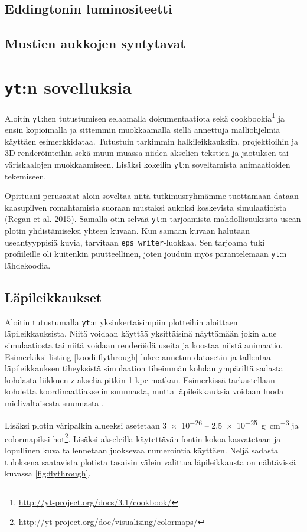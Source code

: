 \documentclass[12pt,a4paper]{article}
\newcommand{\yt}{\texttt{yt}}
\begin{document}
\subsection{Eddingtonin luminositeetti}

\subsection{Mustien aukkojen syntytavat}

\section{\yt :n sovelluksia} %
Aloitin \yt :hen tutustumisen selaamalla dokumentaatiota sekä cookbookia\footnote{\url{http://yt-project.org/docs/3.1/cookbook/}} ja ensin kopioimalla ja sittemmin muokkaamalla siellä annettuja malliohjelmia käyttäen esimerkkidataa. Tutustuin tarkimmin halkileikkauksiin, projektioihin ja 3D-renderöinteihin sekä muun muassa niiden akselien tekstien ja jaotuksen tai väriskaalojen muokkaamiseen. Lisäksi kokeilin \yt :n soveltamista animaatioiden tekemiseen.

Opittuani perusasiat aloin soveltaa niitä tutkimusryhmämme tuottamaan dataan kaasupilven romahtamista suoraan mustaksi aukoksi koskevista simulaatioista (Regan et al. 2015). Samalla otin selvää \yt :n tarjoamista mahdollisuuksista usean plotin yhdistämiseksi yhteen kuvaan. Kun samaan kuvaan halutaan useantyyppisiä kuvia, tarvitaan \texttt{eps\_writer}-luokkaa. Sen tarjoama tuki profiileille oli kuitenkin puutteellinen, joten jouduin myös parantelemaan \yt :n lähdekoodia.

\subsection{Läpileikkaukset}
Aloitin tutustumalla \yt :n yksinkertaisimpiin plotteihin aloittaen läpileikkauksista. Niitä voidaan käyttää yksittäisinä näyttämään jokin alue simulaatiosta tai niitä voidaan renderöidä useita ja koostaa niistä animaatio. Esimerkiksi listing \ref{koodi:flythrough} lukee annetun datasetin ja tallentaa läpileikkauksen tiheyksistä simulaation tiheimmän kohdan ympäriltä sadasta kohdasta liikkuen z-akselia pitkin 1 kpc matkan. Esimerkissä tarkastellaan kohdetta koordinaattiakselin suunnasta, mutta läpileikkauksia voidaan luoda mielivaltaisesta suunnasta \cite{sliceproj}.

Lisäksi plotin väripalkin alueeksi asetetaan \SI{3e-26}{} -- \SI{2.5e-25}{\gram\per\cubic\centi\metre} %
ja colormapiksi hot\footnote{\url{http://yt-project.org/doc/visualizing/colormaps/}}. Lisäksi akseleilla käytettävän fontin kokoa kasvatetaan ja lopullinen kuva tallennetaan juoksevaa numerointia käyttäen. Neljä sadasta tuloksena saatavista plotista tasaisin välein valittua läpileikkausta on nähtävissä kuvassa \ref{fig:flythrough}.
\end{document}
